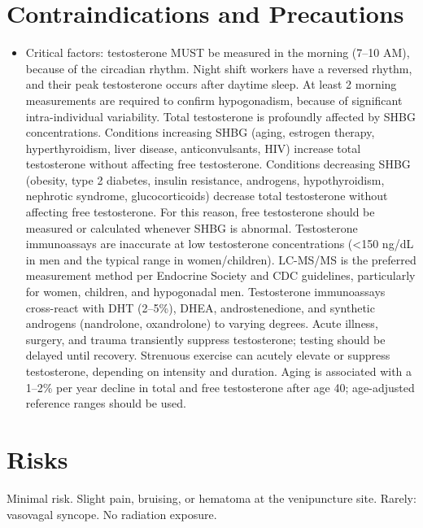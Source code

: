 \section*{Contraindications and Precautions}
\begin{itemize}
  \item Critical factors: testosterone MUST be measured in the morning (7--10 AM), because of the circadian rhythm. Night shift workers have a reversed rhythm, and their peak testosterone occurs after daytime sleep. At least 2 morning measurements are required to confirm hypogonadism, because of significant intra-individual variability. Total testosterone is profoundly affected by SHBG concentrations. Conditions increasing SHBG (aging, estrogen therapy, hyperthyroidism, liver disease, anticonvulsants, HIV) increase total testosterone without affecting free testosterone. Conditions decreasing SHBG (obesity, type 2 diabetes, insulin resistance, androgens, hypothyroidism, nephrotic syndrome, glucocorticoids) decrease total testosterone without affecting free testosterone. For this reason, free testosterone should be measured or calculated whenever SHBG is abnormal. Testosterone immunoassays are inaccurate at low testosterone concentrations (<150 ng/dL in men and the typical range in women/children). LC-MS/MS is the preferred measurement method per Endocrine Society and CDC guidelines, particularly for women, children, and hypogonadal men. Testosterone immunoassays cross-react with DHT (2--5\%), DHEA, androstenedione, and synthetic androgens (nandrolone, oxandrolone) to varying degrees. Acute illness, surgery, and trauma transiently suppress testosterone; testing should be delayed until recovery. Strenuous exercise can acutely elevate or suppress testosterone, depending on intensity and duration. Aging is associated with a 1--2\% per year decline in total and free testosterone after age 40; age-adjusted reference ranges should be used.
\end{itemize}
\section*{Risks}
Minimal risk. Slight pain, bruising, or hematoma at the venipuncture site. Rarely: vasovagal syncope. No radiation exposure.

